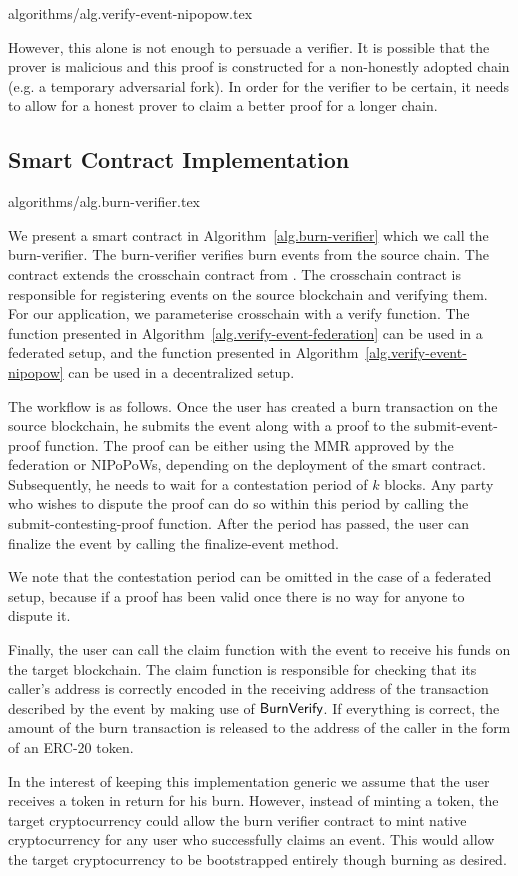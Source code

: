 {algorithms/alg.verify-event-nipopow.tex}

However, this alone is not enough to persuade a verifier. It is possible that the prover is malicious and this proof is constructed for a non-honestly adopted chain (e.g. a temporary adversarial fork). In order for the verifier to be certain, it needs to allow for a honest prover to claim a better proof for a longer chain.

\subsection{Smart Contract Implementation}
{algorithms/alg.burn-verifier.tex}

We present a smart contract in Algorithm~\ref{alg.burn-verifier} which we call the \textsf{burn-verifier}. The \textsf{burn-verifier} verifies burn events from the source chain. The contract extends the \textsf{crosschain} contract from \cite{pow-sidechains}. The \textsf{crosschain} contract is responsible for registering events on the source blockchain and verifying them. For our application, we parameterise \textsf{crosschain} with a \textsf{verify} function. The function presented in Algorithm~\ref{alg.verify-event-federation} can be used in a federated setup, and the function presented in Algorithm~\ref{alg.verify-event-nipopow} can be used in a decentralized setup.

The workflow is as follows. Once the user has created a burn transaction on the source blockchain, he submits the event along with a proof to the \textsf{submit-event-proof} function. The proof can be either using the MMR approved by the federation or NIPoPoWs, depending on the deployment of the smart contract. Subsequently, he needs to wait for a contestation period of $k$ blocks. Any party who wishes to dispute the proof can do so within this period by calling the \textsf{submit-contesting-proof} function. After the period has passed, the user can finalize the event by calling the \textsf{finalize-event} method.

We note that the contestation period can be omitted in the case of a federated setup, because if a proof has been valid once there is no way for anyone to dispute it.

Finally, the user can call the \textsf{claim} function with the event to receive his funds on the target blockchain. The \textsf{claim} function is responsible for checking that its caller's address is correctly encoded in the receiving address of the transaction described by the event by making use of $\mathsf{BurnVerify}$. If everything is correct, the amount of the burn transaction is released to the address of the caller in the form of an ERC-20 token.

In the interest of keeping this implementation generic we assume that the user receives a token in return for his burn. However, instead of minting a token, the target cryptocurrency could allow the burn verifier contract to mint native cryptocurrency for any user who successfully claims an event. This would allow the target cryptocurrency to be bootstrapped entirely though burning as desired.
